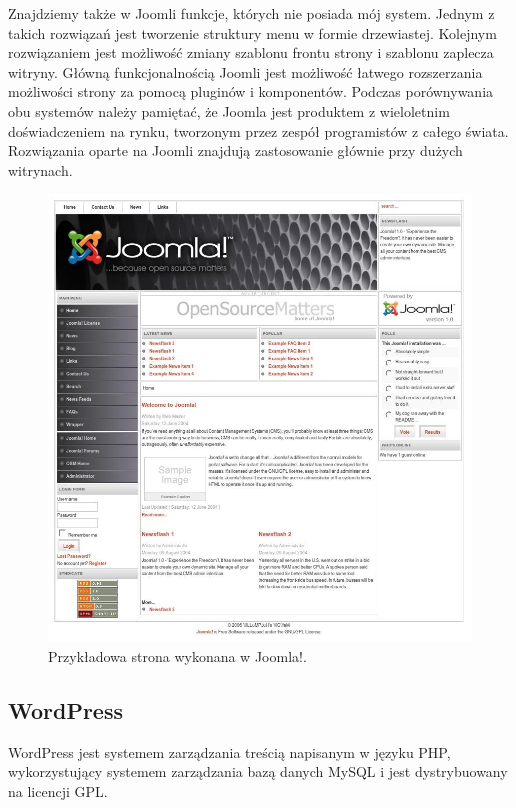 \documentclass[openright]{xmgr}
\begin{document}
Znajdziemy także w Joomli funkcje, których nie posiada mój system. Jednym z takich rozwiązań jest tworzenie struktury menu w formie drzewiastej. Kolejnym rozwiązaniem jest możliwość zmiany szablonu frontu strony i szablonu zaplecza witryny. Główną funkcjonalnością Joomli jest możliwość łatwego rozszerzania możliwości strony za pomocą pluginów i komponentów. Podczas porównywania obu systemów należy pamiętać, że Joomla jest produktem z wieloletnim doświadczeniem na rynku, tworzonym przez zespół programistów z całego świata. Rozwiązania oparte na Joomli znajdują zastosowanie głównie przy dużych witrynach.

\newpage

\begin{figure}[!tbh]
\centering
\includegraphics[width=\linewidth]{fig/joomla}
\caption{Przykładowa strona wykonana w Joomla!.}
\end{figure}

\subsection{WordPress}

WordPress jest systemem zarządzania treścią napisanym w języku PHP, wykorzystujący systemem zarządzania bazą danych MySQL i jest dystrybuowany na licencji GPL. 
\end{document}
